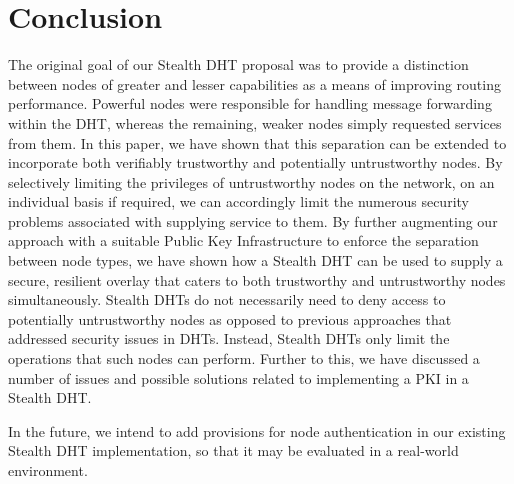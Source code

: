 \documentclass[pdftex,conference,10pt]{IEEEtran}
\begin{document}
\section{Conclusion}
\label{sect-conclusion} The original goal of our Stealth DHT proposal
was to provide a distinction between nodes of greater and lesser
capabilities as a means of improving routing performance. Powerful
nodes were responsible for handling message forwarding within the DHT,
whereas the remaining, weaker nodes simply requested services from
them. In this paper, we have shown that this separation can be extended
to incorporate both verifiably trustworthy and potentially
untrustworthy nodes. By selectively limiting the privileges of
untrustworthy nodes on the network, on an individual basis if required,
we can accordingly limit the numerous security problems associated with
supplying service to them. By further augmenting our approach with a
suitable Public Key Infrastructure to enforce the separation between
node types, we have shown how a Stealth DHT can be used to supply a
secure, resilient overlay that caters to both trustworthy and
untrustworthy nodes simultaneously. Stealth DHTs do not necessarily
need to deny access to potentially untrustworthy nodes as opposed to
previous approaches that addressed security issues in DHTs. Instead,
Stealth DHTs only limit the operations that such nodes can perform.
Further to this, we have discussed a number of issues and possible
solutions related to implementing a PKI in a Stealth DHT.

In the future, we intend to add provisions for node authentication
in our existing Stealth DHT implementation, so that it may be
evaluated in a real-world environment.



\end{document}
